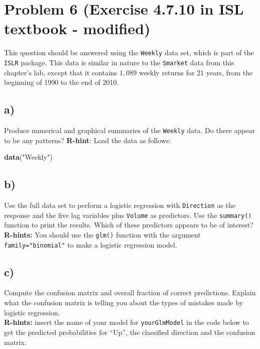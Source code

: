 \documentclass[
]{article}
\newenvironment{Shaded}{\begin{snugshade}}{\end{snugshade}}
\newcommand{\FunctionTok}[1]{\textcolor[rgb]{0.13,0.29,0.53}{\textbf{#1}}}
\newcommand{\NormalTok}[1]{#1}
\newcommand{\StringTok}[1]{\textcolor[rgb]{0.31,0.60,0.02}{#1}}
\begin{document}
\hypertarget{problem-6-exercise-4.7.10-in-isl-textbook---modified}{%
\section{Problem 6 (Exercise 4.7.10 in ISL textbook -
modified)}\label{problem-6-exercise-4.7.10-in-isl-textbook---modified}}

This question should be answered using the \texttt{Weekly} data set,
which is part of the \texttt{ISLR} package. This data is similar in
nature to the \texttt{Smarket} data from this chapter's lab, except that
it contains \(1,089\) weekly returns for \(21\) years, from the
beginning of 1990 to the end of 2010.

\hypertarget{a-5}{%
\subsection{a)}\label{a-5}}

Produce numerical and graphical summaries of the \texttt{Weekly} data.
Do there appear to be any patterns? \textbf{R-hint}: Load the data as
follows:

\begin{Shaded}
\begin{Highlighting}[]
\FunctionTok{data}\NormalTok{(}\StringTok{"Weekly"}\NormalTok{)}
\end{Highlighting}
\end{Shaded}

\hypertarget{b-5}{%
\subsection{b)}\label{b-5}}

Use the full data set to perform a logistic regression with
\texttt{Direction} as the response and the five lag variables plus
\texttt{Volume} as predictors. Use the \texttt{summary()} function to
print the results. Which of these predictors appears to be of
interest?\\
\textbf{R-hints:} You should use the \texttt{glm()} function with the
argument \texttt{family="binomial"} to make a logistic regression model.

\hypertarget{c-3}{%
\subsection{c)}\label{c-3}}

Compute the confusion matrix and overall fraction of correct
predictions. Explain what the confusion matrix is telling you about the
types of mistakes made by logistic regression.\\
\textbf{R-hints:} insert the name of your model for
\texttt{yourGlmModel} in the code below to get the predicted
probabilities for ``Up'', the classified direction and the confusion
matrix.
\end{document}
